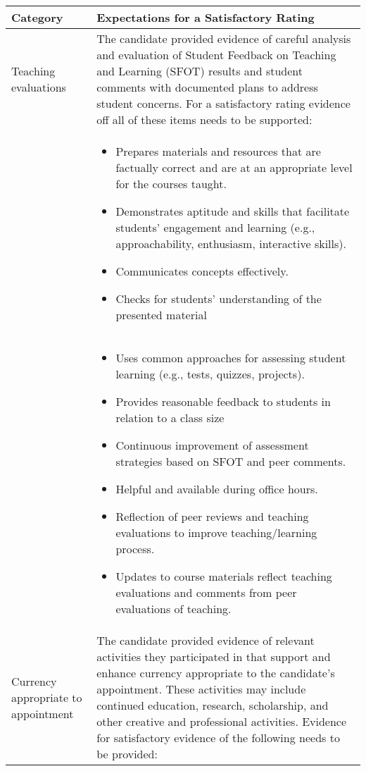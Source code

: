 \documentclass{article}
\begin{document}
\begin{longtable}{p{3cm}p{11cm}}

\hline
\textbf{Category} & \textbf{Expectations for a Satisfactory Rating} \\
\hline
\endhead %
Teaching evaluations & The candidate provided evidence of careful analysis and evaluation of Student Feedback on Teaching and Learning (SFOT) results and student comments with documented plans to address student concerns. For a satisfactory rating evidence off all of these items needs to be supported:  \\
& 	\begin{itemize}[noitemsep,leftmargin=*,topsep=0pt,partopsep=0pt]
    \item Prepares materials and resources that are factually correct and are at an appropriate level for the courses taught.
    \item Demonstrates aptitude and skills that facilitate students’ engagement and learning (e.g., approachability, enthusiasm, interactive skills).
     \item Communicates concepts effectively.
      \item Checks for students’ understanding of the presented material
     \end{itemize} \\
     & \begin{itemize}[noitemsep,leftmargin=*,topsep=0pt,partopsep=0pt]
       \item Uses common approaches for assessing student learning (e.g., tests, quizzes, projects).
        \item Provides reasonable feedback to students in relation to a class size
         \item Continuous improvement of assessment strategies based on SFOT and peer comments.
          \item Helpful and available during office hours.
           \item Reflection of peer reviews and teaching evaluations to improve teaching/learning process.
            \item Updates to course materials reflect teaching evaluations and comments from peer evaluations of teaching.
	\end{itemize}
	\\ \hline
Currency appropriate to appointment & The candidate provided evidence of relevant activities they participated in that support and enhance currency appropriate to the candidate’s appointment. These activities may include continued education, research, scholarship, and other creative and professional activities. Evidence for satisfactory evidence of the following needs to be provided: \\

\end{longtable}
\end{document}
